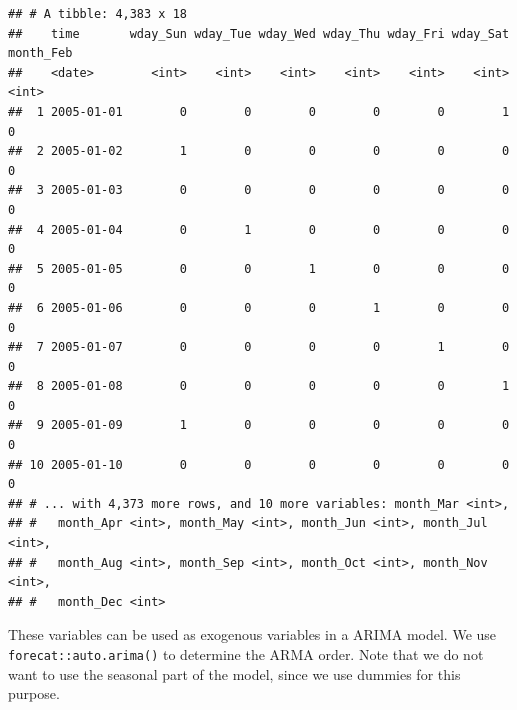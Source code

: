 \documentclass[
]{article}
\newenvironment{Shaded}{\begin{snugshade}}{\end{snugshade}}
\newcommand{\DataTypeTok}[1]{\textcolor[rgb]{0.13,0.29,0.53}{#1}}
\newcommand{\DecValTok}[1]{\textcolor[rgb]{0.00,0.00,0.81}{#1}}
\newcommand{\KeywordTok}[1]{\textcolor[rgb]{0.13,0.29,0.53}{\textbf{#1}}}
\newcommand{\NormalTok}[1]{#1}
\newcommand{\OperatorTok}[1]{\textcolor[rgb]{0.81,0.36,0.00}{\textbf{#1}}}
\newcommand{\OtherTok}[1]{\textcolor[rgb]{0.56,0.35,0.01}{#1}}
\newcommand{\StringTok}[1]{\textcolor[rgb]{0.31,0.60,0.02}{#1}}
\begin{document}
\begin{verbatim}
## # A tibble: 4,383 x 18
##    time       wday_Sun wday_Tue wday_Wed wday_Thu wday_Fri wday_Sat month_Feb
##    <date>        <int>    <int>    <int>    <int>    <int>    <int>     <int>
##  1 2005-01-01        0        0        0        0        0        1         0
##  2 2005-01-02        1        0        0        0        0        0         0
##  3 2005-01-03        0        0        0        0        0        0         0
##  4 2005-01-04        0        1        0        0        0        0         0
##  5 2005-01-05        0        0        1        0        0        0         0
##  6 2005-01-06        0        0        0        1        0        0         0
##  7 2005-01-07        0        0        0        0        1        0         0
##  8 2005-01-08        0        0        0        0        0        1         0
##  9 2005-01-09        1        0        0        0        0        0         0
## 10 2005-01-10        0        0        0        0        0        0         0
## # ... with 4,373 more rows, and 10 more variables: month_Mar <int>,
## #   month_Apr <int>, month_May <int>, month_Jun <int>, month_Jul <int>,
## #   month_Aug <int>, month_Sep <int>, month_Oct <int>, month_Nov <int>,
## #   month_Dec <int>
\end{verbatim}

These variables can be used as exogenous variables in a ARIMA model. We
use \texttt{forecat::auto.arima()} to determine the ARMA order. Note
that we do not want to use the seasonal part of the model, since we use
dummies for this purpose.

\begin{Shaded}
\end{Shaded}
\end{document}
